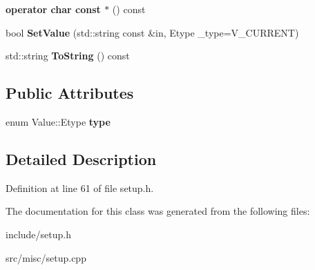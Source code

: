 \begin{DoxyCompactItemize}
\item 
\hypertarget{classValue_a34c3d3e97da4667b1ac6932b3a16fb92}{{\bfseries operator char const $\ast$} () const }\label{classValue_a34c3d3e97da4667b1ac6932b3a16fb92}

\item 
\hypertarget{classValue_a7c785d7517533757bf9b3f7a15cc4e6a}{bool {\bfseries Set\-Value} (std\-::string const \&in, Etype \-\_\-type=V\-\_\-\-C\-U\-R\-R\-E\-N\-T)}\label{classValue_a7c785d7517533757bf9b3f7a15cc4e6a}

\item 
\hypertarget{classValue_a31428e493a421f64254f84cf5fe114f1}{std\-::string {\bfseries To\-String} () const }\label{classValue_a31428e493a421f64254f84cf5fe114f1}

\end{DoxyCompactItemize}
\subsection*{Public Attributes}
\begin{DoxyCompactItemize}
\item 
\hypertarget{classValue_aa8611755fd5d52ca0e16f5cd8caed48f}{enum Value\-::\-Etype {\bfseries type}}\label{classValue_aa8611755fd5d52ca0e16f5cd8caed48f}

\end{DoxyCompactItemize}


\subsection{Detailed Description}


Definition at line 61 of file setup.\-h.



The documentation for this class was generated from the following files\-:\begin{DoxyCompactItemize}
\item 
include/setup.\-h\item 
src/misc/setup.\-cpp\end{DoxyCompactItemize}
